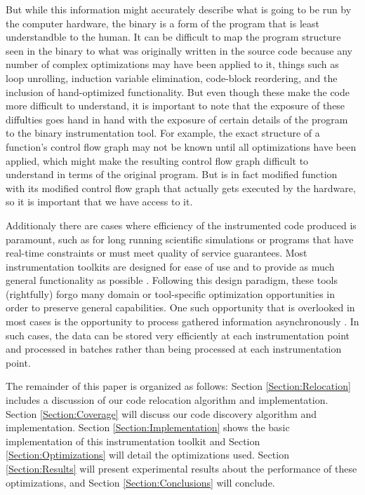 

But while this information might accurately describe what is going to be run by the computer hardware, the
binary is a form of the program that is least understandble to the human. It can be difficult to map the
program structure seen in the binary to what was originally written in the source code because any number of
complex optimizations may have been applied to it, things such as loop unrolling, induction variable 
elimination, code-block reordering, and the inclusion of hand-optimized functionality. But even though these
make the code more difficult to understand, it is important to note that the exposure of these diffulties
goes hand in hand with the exposure of certain details of the program to the binary instrumentation tool. For example, the exact structure
of a function's control flow graph may not be known until all optimizations have been applied, which might
make the resulting control flow graph difficult to understand in terms of the original program. But is in fact
modified function with its modified control flow graph that actually gets executed by the hardware, so it is
important that we have access to it.

Additionaly there are cases where efficiency of the instrumented code produced is paramount, such as for long running scientific simulations or programs that have
real-time constraints or must meet quality of service guarantees. Most instrumentation toolkits are designed for ease
of use and to provide as much general functionality as possible \cite{nethercote2007valgrind}. Following this design paradigm, these tools (rightfully) forgo
many domain or tool-specific optimization opportunities in order to preserve general capabilities. One such opportunity that
is overlooked in most cases is the opportunity to process gathered information asynchronously \cite{gao2005aliter}. In such
cases, the data can be stored very efficiently at each instrumentation point and processed in batches rather than being processed
at each instrumentation point. 

The remainder of this paper is organized as follows: Section \ref{Section:Relocation} includes a discussion
of our code relocation algorithm and implementation. Section \ref{Section:Coverage} will discuss our code discovery
algorithm and implementation.
Section \ref{Section:Implementation} shows the basic implementation of
this instrumentation toolkit and Section \ref{Section:Optimizations} will detail the 
optimizations used. Section \ref{Section:Results} will present experimental results about the
performance of these optimizations, and Section \ref{Section:Conclusions} will conclude. 

